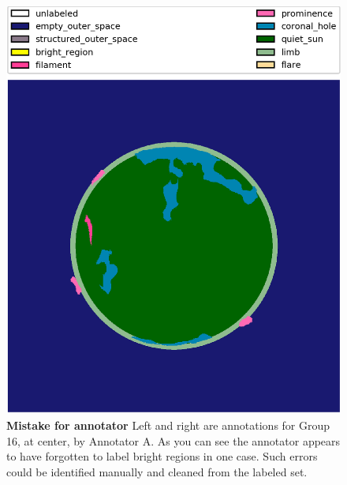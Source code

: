\documentclass[twoside]{report}
\begin{document}
\begin{figure}[ht]
\begin{center}
    \includegraphics[scale=0.1]{g20171015000202-1}
    \caption{{\bf Mistake for annotator} Left and right are annotations for Group 16, at center, by Annotator A. As you can see the annotator appears to have forgotten to label bright regions in one case. Such errors could be identified manually and cleaned from the labeled set. } 
    \label{fig:annotatorconsistency}
 \end{center}
\end{figure}
\end{document}
